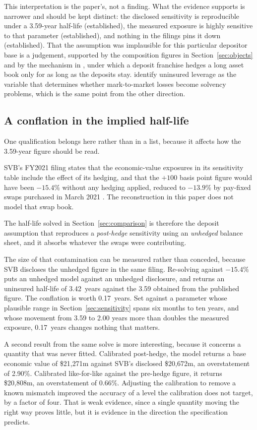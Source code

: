 This interpretation is the paper's, not a finding. What the evidence supports is
narrower and should be kept distinct: the disclosed sensitivity is reproducible under
a 3.59-year half-life (established), the measured exposure is highly sensitive to that
parameter (established), and nothing in the filings pins it down (established). That
the assumption was implausible for this particular depositor base is a judgement,
supported by the composition figures in Section~\ref{sec:objects} and by the mechanism
in \citet{Drechsler2021}, under which a deposit franchise hedges a long asset book
only for as long as the deposits stay. \citet{Jiang2024} identify uninsured leverage
as the variable that determines whether mark-to-market losses become solvency
problems, which is the same point from the other direction.

\subsection{A conflation in the implied half-life}

One qualification belongs here rather than in a list, because it affects how the
3.59-year figure should be read.

SVB's FY2021 filing states that the economic-value exposures in its sensitivity table
include the effect of its hedging, and that the $+100$ basis point figure would have
been $-15.4\%$ without any hedging applied, reduced to $-13.9\%$ by pay-fixed swaps
purchased in March 2021 \citep{SVB10K2021}. The reconstruction in this paper does not
model that swap book.

The half-life solved in Section~\ref{sec:comparison} is therefore the deposit
assumption that reproduces a \emph{post-hedge} sensitivity using an \emph{unhedged}
balance sheet, and it absorbs whatever the swaps were contributing.

The size of that contamination can be measured rather than conceded, because SVB
discloses the unhedged figure in the same filing. Re-solving against $-15.4\%$ puts
an unhedged model against an unhedged disclosure, and returns an uninsured half-life
of 3.42~years against the 3.59 obtained from the published figure. The conflation is
worth 0.17~years. Set against a parameter whose plausible range in
Section~\ref{sec:sensitivity} spans six months to ten years, and whose movement from
3.59 to 2.00 years more than doubles the measured exposure, 0.17~years changes
nothing that matters.

A second result from the same solve is more interesting, because it concerns a
quantity that was never fitted. Calibrated post-hedge, the model returns a base
economic value of \$21,271m against SVB's disclosed \$20,672m, an overstatement of
2.90\%. Calibrated like-for-like against the pre-hedge figure, it returns \$20,808m,
an overstatement of 0.66\%. Adjusting the calibration to remove a known mismatch
improved the accuracy of a level the calibration does not target, by a factor of four.
That is weak evidence, since a single quantity moving the right way proves little, but
it is evidence in the direction the specification predicts.

